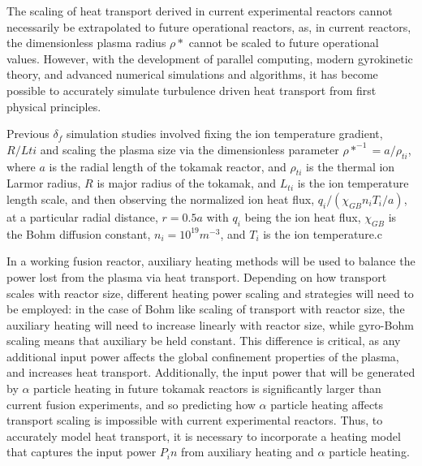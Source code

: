 \documentclass{article}
\begin{document}
The scaling of heat transport derived in current experimental reactors cannot necessarily be extrapolated to future operational reactors, as, in current reactors, the dimensionless plasma radius $\rho*$ cannot be scaled to future operational values. However, with the development of parallel computing, modern gyrokinetic theory, and advanced numerical simulations and algorithms, it has become possible to accurately simulate turbulence driven heat transport from first physical principles.

Previous $\delta_f$ simulation studies involved fixing the ion temperature gradient, $R/L{ti}$ and scaling the plasma size via the dimensionless parameter $\rho*^{-1} = a/\rho_{ti}$, where $a$ is the radial length of the tokamak reactor, and $\rho_{ti}$ is the thermal ion Larmor radius, $R$ is major radius of the tokamak, and $L_{ti}$ is the ion temperature length scale, and then observing the normalized ion heat flux, $q_i/(\chi_{GB}n_iT_i/a)$, at a particular radial distance, $r = 0.5a$ with $q_i $ being the ion heat flux, $\chi_{GB}$ is the Bohm diffusion constant, $n_i= 10^{19}m^{-3}$, and $T_i$ is the ion temperature.c


In a working fusion reactor, auxiliary heating methods will be used to balance the power lost from the plasma via heat transport. Depending on how transport scales with reactor size, different heating power scaling and strategies will need to be employed: in the case of Bohm like scaling of transport with reactor size, the auxiliary heating will need to increase linearly with reactor size, while gyro-Bohm scaling means that auxiliary be held constant. This difference is critical, as any additional input power affects the global confinement properties of the plasma, and increases heat transport. Additionally, the input power that will be generated by $\alpha$ particle heating in future tokamak reactors is significantly larger than current fusion experiments, and so predicting how $\alpha$ particle heating affects transport scaling is impossible with current experimental reactors.  Thus, to accurately model heat transport, it is necessary to incorporate a heating model that captures the input power $P_in$ from auxiliary heating and $\alpha$ particle heating.\\
\end{document}
